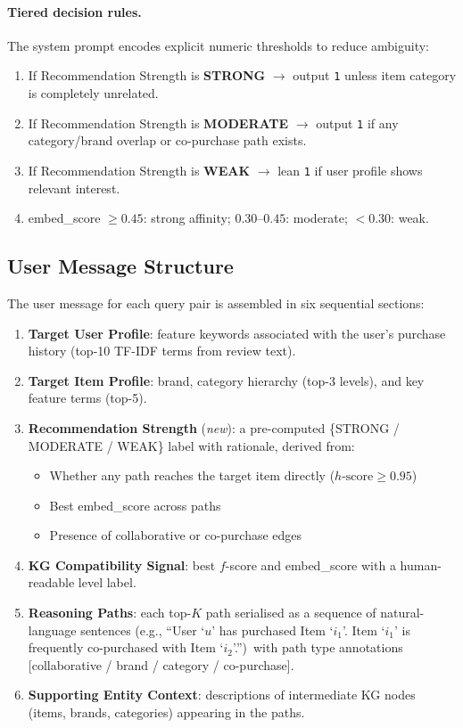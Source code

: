 \documentclass[12pt,a4paper]{article}
\begin{document}
\paragraph{Tiered decision rules.}
The system prompt encodes explicit numeric thresholds to reduce ambiguity:
\begin{enumerate}[leftmargin=2em]
  \item If Recommendation Strength is \textbf{STRONG} $\to$ output \texttt{1}
        unless item category is completely unrelated.
  \item If Recommendation Strength is \textbf{MODERATE} $\to$ output \texttt{1}
        if any category/brand overlap or co-purchase path exists.
  \item If Recommendation Strength is \textbf{WEAK} $\to$ lean \texttt{1}
        if user profile shows relevant interest.
  \item embed\_score $\geq 0.45$: strong affinity;
        $0.30$--$0.45$: moderate; $< 0.30$: weak.
\end{enumerate}

\subsection{User Message Structure}

The user message for each query pair is assembled in six sequential sections:

\begin{enumerate}[leftmargin=2em,label=\textbf{\arabic*.}]
  \item \textbf{Target User Profile}: feature keywords associated with the user's
        purchase history (top-10 TF-IDF terms from review text).
  \item \textbf{Target Item Profile}: brand, category hierarchy (top-3 levels),
        and key feature terms (top-5).
  \item \textbf{Recommendation Strength} (\emph{new}): a pre-computed
        \{STRONG / MODERATE / WEAK\} label with rationale, derived from:
        \begin{itemize}
          \item Whether any path reaches the target item directly ($h\text{-score} \geq 0.95$)
          \item Best embed\_score across paths
          \item Presence of collaborative or co-purchase edges
        \end{itemize}
  \item \textbf{KG Compatibility Signal}: best $f$-score and embed\_score with
        a human-readable level label.
  \item \textbf{Reasoning Paths}: each top-$K$ path serialised as a sequence of
        natural-language sentences (e.g.,
        ``User `$u$' has purchased Item `$i_1$'.
          Item `$i_1$' is frequently co-purchased with Item `$i_2$'.'')\
        with path type annotations [collaborative / brand / category / co-purchase].
  \item \textbf{Supporting Entity Context}: descriptions of intermediate KG nodes
        (items, brands, categories) appearing in the paths.
\end{enumerate}
\end{document}

